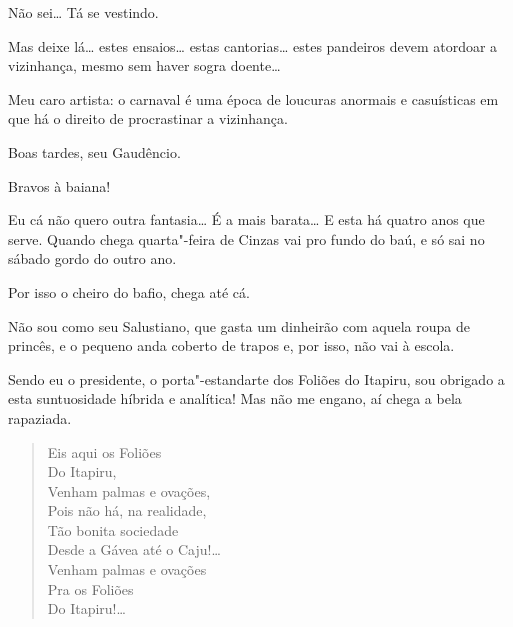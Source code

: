 \begin{linenumbers}
 Não sei\ldots{} Tá se vestindo. 

 Mas deixe lá\ldots{} estes ensaios\ldots{} estas cantorias\ldots{} estes
pandeiros devem atordoar a vizinhança, mesmo sem haver sogra doente\ldots{}

 Meu caro artista: o carnaval é uma época de loucuras
anormais e casuísticas em que há o direito de procrastinar a vizinhança.




  Boas tardes, seu Gaudêncio.

 Bravos à baiana!

 Eu cá não quero outra fantasia\ldots{} É a mais barata\ldots{} E
esta há quatro anos que serve. Quando chega quarta"-feira de Cinzas vai pro fundo
do baú, e só sai no sábado gordo do outro ano.

 Por isso o cheiro do bafio, chega até cá.

 Não sou como seu Salustiano, que gasta um dinheirão com
aquela roupa de princês, e o pequeno anda coberto de trapos e, por isso, não vai
à escola. 

 Sendo eu o presidente, o porta"-estandarte dos
Foliões do Itapiru, sou obrigado a esta suntuosidade híbrida e
analítica! Mas não me engano, aí chega a bela rapaziada.


\begin{verse}
Eis aqui os Foliões\\
\quad Do Itapiru,\\
Venham palmas e ovações,\\
Pois não há, na realidade,\\
Tão bonita sociedade\\
Desde a Gávea até o Caju!\ldots{}\\
Venham palmas e ovações\\
\quad Pra os Foliões\\
\quad Do Itapiru!\ldots{}
\end{verse}


\end{linenumbers}
